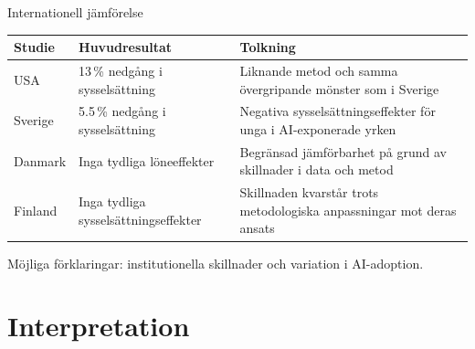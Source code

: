 \documentclass[aspectratio=169,11pt]{beamer}
\begin{document}
\begin{frame}{Internationell jämförelse}

\small

\begin{table}[h]
\centering
\begin{tabular}{p{2.3cm} p{3.3cm} p{4.8cm}}
\hline
\textbf{Studie} & \textbf{Huvudresultat} & \textbf{Tolkning} \\
\hline

USA &
13\,\% nedgång i sysselsättning &
Liknande metod och samma övergripande mönster som i Sverige \\[2mm]

Sverige &
5.5\,\% nedgång i sysselsättning &
Negativa sysselsättningseffekter för unga i AI-exponerade yrken \\[2mm]

Danmark &
Inga tydliga löneeffekter &
Begränsad jämförbarhet på grund av skillnader i data och metod
 \\[2mm]

Finland &
Inga tydliga sysselsättningseffekter &
Skillnaden kvarstår trots metodologiska anpassningar mot deras ansats \\

\hline
\end{tabular}
\end{table}

\vspace{2mm}

\footnotesize
Möjliga förklaringar: institutionella skillnader och variation i AI-adoption.

\end{frame}


\section{Interpretation}
\end{document}
